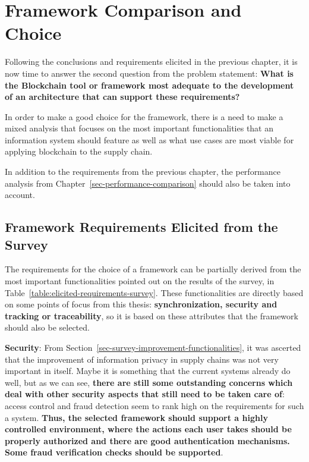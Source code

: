 \section{Framework Comparison and Choice}

Following the conclusions and requirements elicited in the previous chapter, it is now time to answer the second question from the problem statement: \textbf{What is the Blockchain tool or framework most adequate to the development of an architecture that can support these requirements?}

In order to make a good choice for the framework, there is a need to make a mixed analysis that focuses on the most important functionalities that an information system should feature as well as what use cases are most viable for applying blockchain to the supply chain.

In addition to the requirements from the previous chapter, the performance analysis from Chapter~\ref{sec-performance-comparison} should also be taken into account.

\subsection{Framework Requirements Elicited from the Survey}

The requirements for the choice of a framework can be partially derived from the most important functionalities pointed out on the results of the survey, in Table~\ref{table:elicited-requirements-survey}. These functionalities are directly based on some points of focus from this thesis: \textbf{synchronization, security and tracking or traceability}, so it is based on these attributes that the framework should also be selected.   

\par \textbf{Security}: From Section~\ref{sec-survey-improvement-functionalities}, it was ascerted that the improvement of information privacy in supply chains was not very important in itself. Maybe it is something that the current systems already do well, but as we can see, \textbf{there are still some outstanding concerns which deal with other security aspects that still need to be taken care of}: access control and fraud detection seem to rank high on the requirements for such a system. \textbf{Thus, the selected framework should support a highly controlled environment, where the actions each user takes should be properly authorized and there are good authentication mechanisms. Some fraud verification checks should be supported}.

